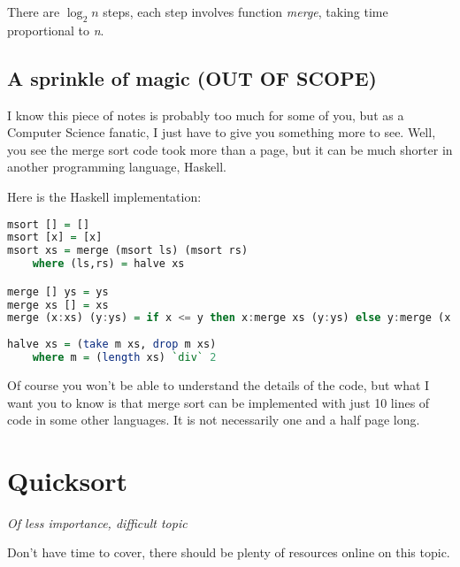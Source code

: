 There are $\log_2 n$ steps, each step involves function \textit{merge}, taking time proportional to \textit{n}.

\subsection*{A sprinkle of magic (OUT OF SCOPE)}

I know this piece of notes is probably too much for some of you, but as a Computer Science fanatic, I just have to give you something more to see. Well, you see the merge sort code took more than a page, but it can be much shorter in another programming language, Haskell. 

Here is the Haskell implementation:

\begin{lstlisting}[language=Haskell]
msort [] = []
msort [x] = [x]
msort xs = merge (msort ls) (msort rs)
    where (ls,rs) = halve xs

merge [] ys = ys
merge xs [] = xs
merge (x:xs) (y:ys) = if x <= y then x:merge xs (y:ys) else y:merge (x:xs) ys
    
halve xs = (take m xs, drop m xs)
    where m = (length xs) `div` 2

\end{lstlisting}

Of course you won't be able to understand the details of the code, but what I want you to know is that merge sort can be implemented with just 10 lines of code in some other languages. It is not necessarily one and a half page long.

\section{Quicksort}

\textit{Of less importance, difficult topic}
\vspace{6mm}

Don't have time to cover, there should be plenty of resources online on this topic.




    
    
